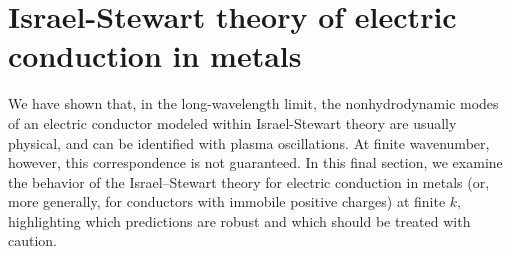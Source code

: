 \documentclass[a4paper, amsfonts, amssymb, amsmath, reprint, showkeys, nofootinbib, twoside,notitlepage,onecolumn]{revtex4-1}
\newcommand{\spc}{\quad \quad \quad}
\theoremstyle{definition}
\theoremstyle{theorem}
\begin{document}






\section{Israel-Stewart theory of electric conduction in metals}
\vspace{-0.3cm}

We have shown that, in the long-wavelength limit, the nonhydrodynamic modes of an electric conductor modeled within Israel-Stewart theory are usually physical, and can be identified with plasma oscillations. At finite wavenumber, however, this correspondence is not guaranteed. In this final section, we examine the behavior of the Israel–Stewart theory for electric conduction in metals (or, more generally, for conductors with immobile positive charges) at finite $k$, highlighting which predictions are robust and which should be treated with caution.
\end{document}

